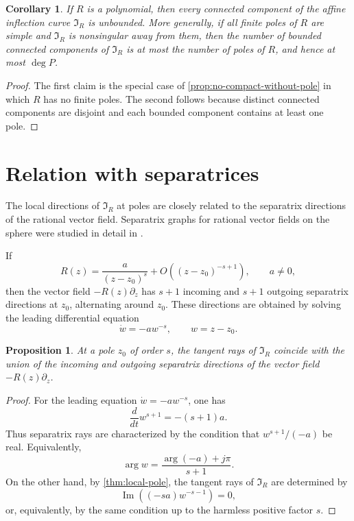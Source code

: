\documentclass[11pt,reqno]{amsart}
\newtheorem{proposition}[theorem]{Proposition}
\newtheorem{corollary}[theorem]{Corollary}
\theoremstyle{definition}
\theoremstyle{remark}
\newcommand{\I}{\mathfrak I}
\renewcommand{\Im}{\operatorname{Im}}
\begin{document}
\begin{corollary}\label{cor:polynomial-no-oval}
If $R$ is a polynomial, then every connected component of the affine inflection curve $\I_R$ is unbounded.  More generally, if all finite poles of $R$ are simple and $\I_R$ is nonsingular away from them, then the number of bounded connected components of $\I_R$ is at most the number of poles of $R$, and hence at most $\deg P$.
\end{corollary}

\begin{proof}
The first claim is the special case of \cref{prop:no-compact-without-pole} in which $R$ has no finite poles.  The second follows because distinct connected components are disjoint and each bounded component contains at least one pole.
\end{proof}

\section{Relation with separatrices}

The local directions of $\I_R$ at poles are closely related to the separatrix directions of the rational vector field.  Separatrix graphs for rational vector fields on the sphere were studied in detail in \cite{Benzinger,NeedhamKing,BrannerDias,DiasGarijo,Klimes,Fiedler}.

If
\[
        R(z)=\frac{a}{(z-z_0)^s}+O((z-z_0)^{-s+1}),
        \qquad a\ne0,
\]
then the vector field $-R(z)\partial_z$ has $s+1$ incoming and $s+1$ outgoing separatrix directions at $z_0$, alternating around $z_0$.  These directions are obtained by solving the leading differential equation
\[
        \dot w=-a w^{-s},
        \qquad w=z-z_0.
\]

\begin{proposition}\label{prop:sep-inflection}
At a pole $z_0$ of order $s$, the tangent rays of $\I_R$ coincide with the union of the incoming and outgoing separatrix directions of the vector field $-R(z)\partial_z$.
\end{proposition}

\begin{proof}
For the leading equation $\dot w=-a w^{-s}$, one has
\[
        \frac{d}{dt}w^{s+1}=-(s+1)a.
\]
Thus separatrix rays are characterized by the condition that $w^{s+1}/(-a)$ be real.  Equivalently,
\[
        \arg w=\frac{\arg(-a)+j\pi}{s+1}.
\]
On the other hand, by \cref{thm:local-pole}, the tangent rays of $\I_R$ are determined by
\[
        \Im((-sa)w^{-s-1})=0,
\]
or, equivalently, by the same condition up to the harmless positive factor $s$.
\end{proof}
\end{document}
